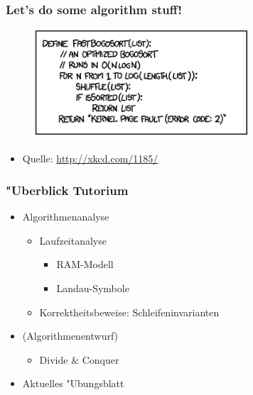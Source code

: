 \documentclass[t]{beamer}
\begin{document}
\begin{frame}[fragile]
  \frametitle{Let's do some algorithm stuff!}
  \begin{figure}[!t]
    \includegraphics[width=300px]{fastbogosort.png}
    \label{fig:fastbogosort}
  \end{figure}
  \begin{itemize}
  \item Quelle: \url{http://xkcd.com/1185/}
  \end{itemize}
\end{frame}

\begin{frame}
  \frametitle{"Uberblick Tutorium}
  \begin{itemize}
  \item Algorithmenanalyse
    \begin{itemize}
    \item Laufzeitanalyse
      \begin{itemize}
      \item RAM-Modell
      \item Landau-Symbole
      \end{itemize}
    \item Korrektheitsbeweise: Schleifeninvarianten
    \end{itemize}
  \item (Algorithmenentwurf)
    \begin{itemize}
    \item Divide \& Conquer
    \end{itemize}
  \item Aktuelles "Ubungsblatt
  \end{itemize}
\end{frame}
\end{document}
